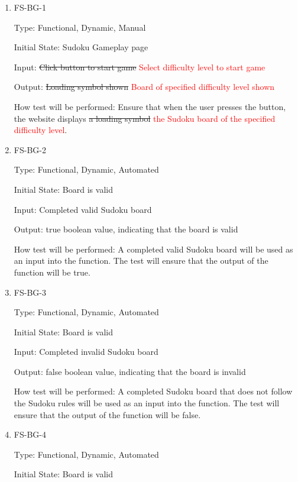 \documentclass[11pt]{article}
\begin{document}
\begin{enumerate}

\item{FS-BG-1\\}

Type: Functional, Dynamic, Manual
					
Initial State: Sudoku Gameplay page
					
Input: \sout{Click button to start game} \textcolor{red}{Select difficulty level to start game}
					
Output: \sout{Loading symbol shown} \textcolor{red}{Board of specified difficulty level shown}
					
How test will be performed: Ensure that when the user presses the button, the website displays \sout{a loading symbol} \textcolor{red}{the Sudoku board of the specified difficulty level}.
					
\item{FS-BG-2\\}

Type: Functional, Dynamic, Automated
					
Initial State: Board is valid
					
Input: Completed valid Sudoku board
					
Output: true boolean value, indicating that the board is valid
					
How test will be performed: A completed valid Sudoku board will be used as an input into the function. The test will ensure that the output of the function will be true.

\item{FS-BG-3\\}

Type: Functional, Dynamic, Automated
					
Initial State: Board is valid
					
Input: Completed invalid Sudoku board
					
Output: false boolean value, indicating that the board is invalid
					
How test will be performed: A completed Sudoku board that does not follow the Sudoku rules will be used as an input into the function. The test will ensure that the output of the function will be false.

\item{FS-BG-4\\}

Type: Functional, Dynamic, Automated
					
Initial State: Board is valid
					

\end{enumerate}
\end{document}

